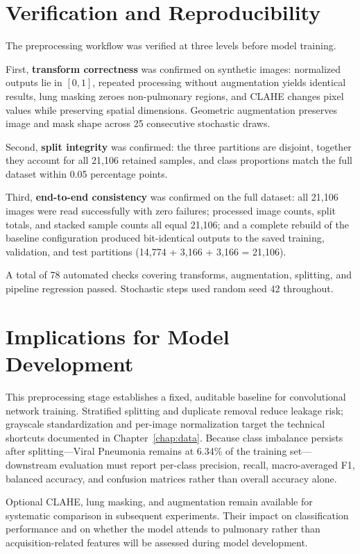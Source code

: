 \section{Verification and Reproducibility}

The preprocessing workflow was verified at three levels before model training.

First, \textbf{transform correctness} was confirmed on synthetic images:
normalized outputs lie in $[0, 1]$, repeated processing without augmentation
yields identical results, lung masking zeroes non-pulmonary regions, and CLAHE
changes pixel values while preserving spatial dimensions. Geometric augmentation
preserves image and mask shape across 25 consecutive stochastic draws.

Second, \textbf{split integrity} was confirmed: the three partitions are disjoint,
together they account for all 21{,}106 retained samples, and class proportions
match the full dataset within 0.05 percentage points.

Third, \textbf{end-to-end consistency} was confirmed on the full dataset:
all 21{,}106 images were read successfully with zero failures; processed image
counts, split totals, and stacked sample counts all equal 21{,}106; and a
complete rebuild of the baseline configuration produced bit-identical outputs
to the saved training, validation, and test partitions
(14{,}774 + 3{,}166 + 3{,}166 = 21{,}106).

A total of 78 automated checks covering transforms, augmentation, splitting,
and pipeline regression passed. Stochastic steps used random seed 42 throughout.

\section{Implications for Model Development}

This preprocessing stage establishes a fixed, auditable baseline for convolutional
network training. Stratified splitting and duplicate removal reduce leakage risk;
grayscale standardization and per-image normalization target the technical shortcuts
documented in Chapter~\ref{chap:data}. Because class imbalance persists after
splitting---Viral Pneumonia remains at 6.34\% of the training set---downstream
evaluation must report per-class precision, recall, macro-averaged F1, balanced
accuracy, and confusion matrices rather than overall accuracy alone.

Optional CLAHE, lung masking, and augmentation remain available for systematic
comparison in subsequent experiments. Their impact on classification performance
and on whether the model attends to pulmonary rather than acquisition-related
features will be assessed during model development.
